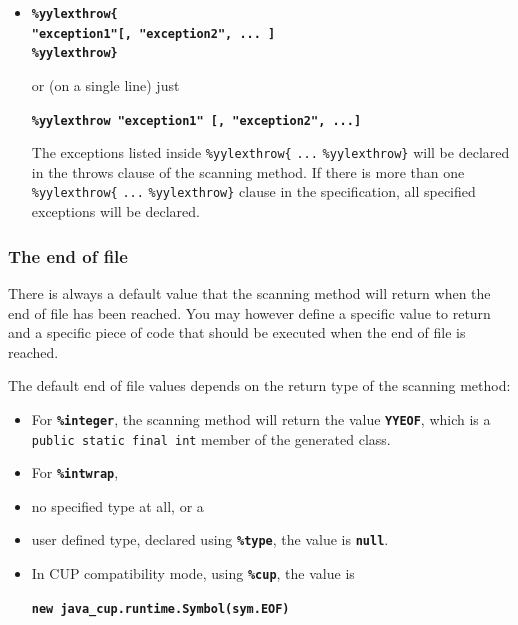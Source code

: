 \documentclass[11pt]{scrartcl}
\begin{document}
\begin{itemize}
\item
{\bf \verb+%yylexthrow{+}\\
{\bf \texttt{"exception1"[, "exception2", ... ]}}\\
{\bf \verb+%yylexthrow}+}

or (on a single line) just

{\bf \texttt{\%yylexthrow "exception1" [,  "exception2", ...]}}

The exceptions listed inside \verb+%yylexthrow{+ \texttt{...} \verb+%yylexthrow}+ 
will be declared in the throws clause of the scanning method. If there is
more than one \verb+%yylexthrow{+ \texttt{...} \verb+%yylexthrow}+ clause in
the specification, all specified exceptions will be declared.
\end{itemize}

\subsubsection{The end of file\label{EOF}}
There is always a default value that the scanning method will return when
the end of file has been reached. You may however define a specific value
to return and a specific piece of code that should be executed when the
end of file is reached.

The default end of file values depends on the return type of the scanning method:
\begin{itemize}
\item
For {\bf \texttt{\%integer}}, the scanning method will return the value
{\bf \texttt{YYEOF}}, which is a \texttt{public static final int} member
of the generated class.

\item
For {\bf \texttt{\%intwrap}}, 
\item
no specified type at all, or a 
\item
user defined type, declared using {\bf \texttt{\%type}}, the value is {\bf \texttt{null}}.

\item
In CUP compatibility mode, using {\bf \texttt{\%cup}}, the value is 

{\bf \texttt{new java\_cup.runtime.Symbol(sym.EOF)}}
\end{itemize}
\end{document}
